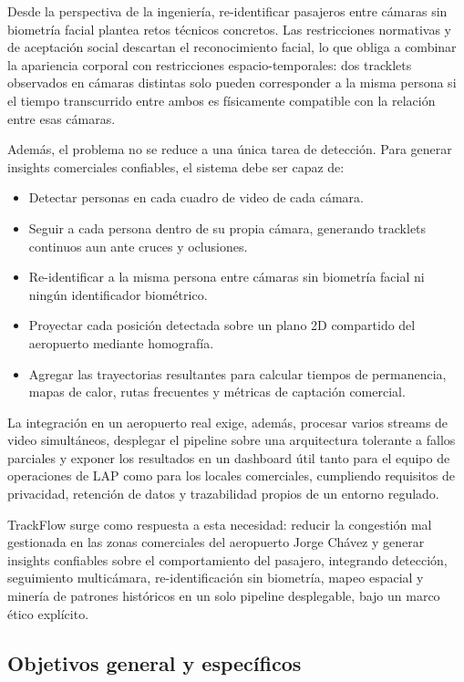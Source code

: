 \documentclass[12pt,a4paper]{article}
\begin{document}
Desde la perspectiva de la ingeniería, re-identificar pasajeros entre
cámaras sin biometría facial plantea retos técnicos concretos. Las
restricciones normativas y de aceptación social descartan el
reconocimiento facial, lo que obliga a combinar la apariencia corporal con
restricciones espacio-temporales: dos tracklets observados en cámaras
distintas solo pueden corresponder a la misma persona si el tiempo
transcurrido entre ambos es físicamente compatible con la relación entre
esas cámaras.

Además, el problema no se reduce a una única tarea de detección. Para
generar insights comerciales confiables, el sistema debe ser capaz de:
\begin{itemize}
    \item Detectar personas en cada cuadro de video de cada cámara.
    \item Seguir a cada persona dentro de su propia cámara, generando
    tracklets continuos aun ante cruces y oclusiones.
    \item Re-identificar a la misma persona entre cámaras sin biometría
    facial ni ningún identificador biométrico.
    \item Proyectar cada posición detectada sobre un plano 2D compartido
    del aeropuerto mediante homografía.
    \item Agregar las trayectorias resultantes para calcular tiempos de
    permanencia, mapas de calor, rutas frecuentes y métricas de
    captación comercial.
\end{itemize}

La integración en un aeropuerto real exige, además, procesar
varios streams de video simultáneos, desplegar el pipeline sobre una
arquitectura tolerante a fallos parciales y exponer los resultados en un
dashboard útil tanto para el equipo de operaciones de LAP como para los
locales comerciales, cumpliendo requisitos de privacidad, retención de
datos y trazabilidad propios de un entorno regulado.

TrackFlow surge como respuesta a esta necesidad: reducir la congestión
mal gestionada en las zonas comerciales del aeropuerto Jorge Chávez y
generar insights confiables sobre el comportamiento del pasajero,
integrando detección, seguimiento multicámara, re-identificación sin
biometría, mapeo espacial y minería de patrones históricos en un solo
pipeline desplegable, bajo un marco ético explícito.

\subsection{Objetivos general y específicos}
\end{document}

